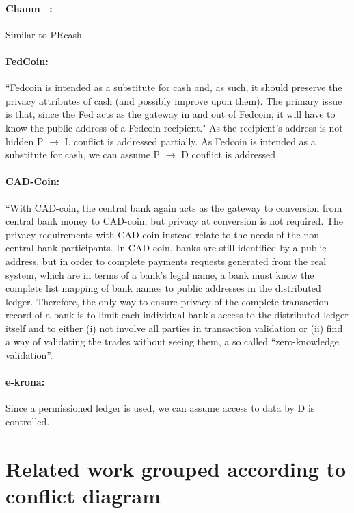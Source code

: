 \documentclass[runningheads]{llncs}
\begin{document}
 \paragraph{Chaum \etal~\cite{CGM21}:} Similar to PRcash
 
 \paragraph{FedCoin:} ``Fedcoin is intended as a substitute for cash and, as such, it should preserve the privacy attributes of cash (and possibly improve upon them). The primary issue is that, since the Fed acts as the gateway in and out of Fedcoin,
 it will have to know the public address of a Fedcoin recipient." As the recipient's address is not hidden  P $\rightarrow$ L conflict is addressed partially. As Fedcoin is intended as a substitute for cash, we can assume  P $\rightarrow$ D conflict is addressed
 
 \paragraph{CAD-Coin:} 
 
 ``With CAD-coin, the central bank again acts as the gateway to conversion from central bank money to CAD-coin, but privacy at conversion is not required.  The privacy requirements with CAD-coin instead relate to the needs of the non-central bank participants.  In CAD-coin, banks are still identified by a public address, but in order to complete payments requests generated from the real system, which are in terms of a bank’s legal name, a bank must know the complete list mapping of bank names to public addresses in the distributed ledger. Therefore, the only way to ensure privacy of the complete transaction record of a bank is to limit each individual bank’s access to the distributed ledger itself and to either (i) not involve all parties in transaction validation or (ii) find a way of validating the trades without seeing them, a so called “zero-knowledge validation”.~\cite{GR16}
 
 \paragraph{e-krona:} Since a permissioned ledger is used, we can assume access to data by D is controlled.
 
\section{Related work grouped according to conflict diagram}
\end{document}
